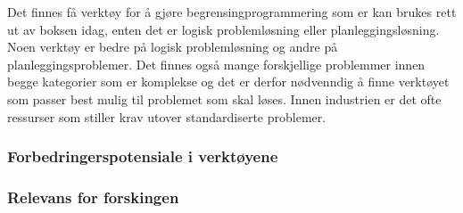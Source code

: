 Det finnes få verktøy for å gjøre begrensingprogrammering som er kan brukes rett ut av boksen idag, enten det er logisk problemløsning eller planleggingsløsning. Noen verktøy er bedre på logisk problemløsning og andre på planleggingsproblemer. Det finnes også mange forskjellige problemmer innen begge kategorier som er komplekse og det er derfor nødvenndig å finne verktøyet som passer best mulig til problemet som skal løses. Innen industrien er det ofte ressurser som stiller krav utover standardiserte problemer.

\subsubsection{Forbedringerspotensiale i verktøyene}

\subsubsection{Relevans for forskingen}